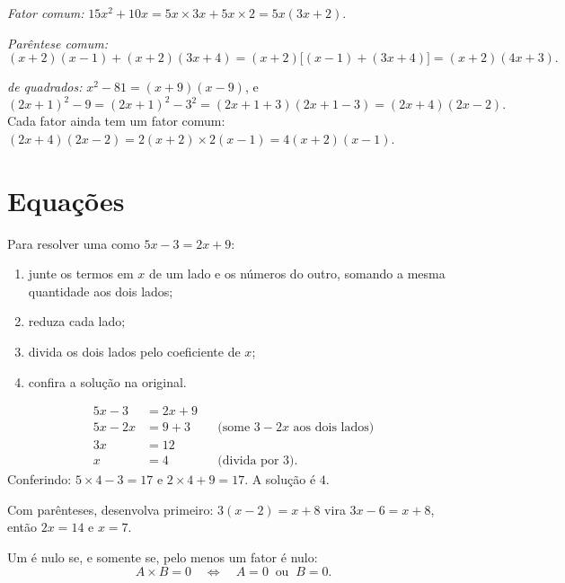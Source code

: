 \begin{example}\label{ex:g9:algebra:factor}
\emph{Fator comum:}
$15x^2 + 10x = 5x \times 3x + 5x \times 2 = 5x(3x + 2)$.

\emph{Parêntese comum:}
\[
(x+2)(x-1) + (x+2)(3x+4) = (x+2)\bigl[(x-1) + (3x+4)\bigr]
= (x+2)(4x+3).
\]

\emph{ de quadrados:}
$x^2 - 81 = (x+9)(x-9)$, e
\[
(2x+1)^2 - 9 = (2x+1)^2 - 3^2 = (2x+1+3)(2x+1-3) = (2x+4)(2x-2).
\]
Cada fator ainda tem um fator comum:
$(2x+4)(2x-2) = 2(x+2) \times 2(x-1) = 4(x+2)(x-1)$.
\end{example}

\section{Equações}

\begin{method}\label{met:g9:algebra:firstdegree}
Para resolver uma  como $5x - 3 = 2x + 9$:
\begin{enumerate}
  \item junte os termos em $x$ de um lado e os números do outro,
        somando a mesma quantidade aos dois lados;
  \item reduza cada lado;
  \item divida os dois lados pelo coeficiente de $x$;
  \item confira a solução na  original.
\end{enumerate}
\end{method}

\begin{example}\label{ex:g9:algebra:firstdegree}
\begin{align*}
5x - 3 &= 2x + 9 \\
5x - 2x &= 9 + 3 && \text{(some $3 - 2x$ aos dois lados)}\\
3x &= 12 \\
x &= 4 && \text{(divida por 3).}
\end{align*}
Conferindo: $5 \times 4 - 3 = 17$ e $2 \times 4 + 9 = 17$. A solução é
$4$.

Com parênteses, desenvolva primeiro: $3(x - 2) = x + 8$ vira
$3x - 6 = x + 8$, então $2x = 14$ e $x = 7$.
\end{example}

\begin{theorem}\label{thm:g9:algebra:zeroproduct}
Um  é nulo se, e somente se, pelo menos um fator é nulo:
\[
A \times B = 0
\quad\Longleftrightarrow\quad
A = 0 \ \text{ ou } \ B = 0 .
\]
\end{theorem}


